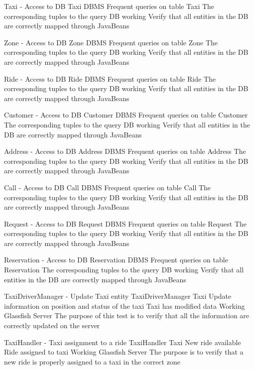 \testx
{Taxi - Access to DB}
{Taxi}
{DBMS}
{Frequent queries on table Taxi}
{The corresponding tuples to the query}
{DB working}
{Verify that all entities in the DB are correctly mapped through JavaBeans}

\testx
{Zone - Access to DB}
{Zone}
{DBMS}
{Frequent queries on table Zone}
{The corresponding tuples to the query}
{DB working}
{Verify that all entities in the DB are correctly mapped through JavaBeans}

\testx
{Ride - Access to DB}
{Ride}
{DBMS}
{Frequent queries on table Ride}
{The corresponding tuples to the query}
{DB working}
{Verify that all entities in the DB are correctly mapped through JavaBeans}

\testx
{Customer - Access to DB}
{Customer}
{DBMS}
{Frequent queries on table Customer}
{The corresponding tuples to the query}
{DB working}
{Verify that all entities in the DB are correctly mapped through JavaBeans}

\testx
{Address - Access to DB}
{Address}
{DBMS}
{Frequent queries on table Address}
{The corresponding tuples to the query}
{DB working}
{Verify that all entities in the DB are correctly mapped through JavaBeans}

\testx
{Call - Access to DB}
{Call}
{DBMS}
{Frequent queries on table Call}
{The corresponding tuples to the query}
{DB working}
{Verify that all entities in the DB are correctly mapped through JavaBeans}

\testx
{Request - Access to DB}
{Request}
{DBMS}
{Frequent queries on table Request}
{The corresponding tuples to the query}
{DB working}
{Verify that all entities in the DB are correctly mapped through JavaBeans}

\testx
{Reservation - Access to DB}
{Reservation}
{DBMS}
{Frequent queries on table Reservation}
{The corresponding tuples to the query}
{DB working}
{Verify that all entities in the DB are correctly mapped through JavaBeans}

\testx
{TaxiDriverManager - Update Taxi entity}
{TaxiDriverManager}
{Taxi}
{Update information on position and status of the taxi}
{Taxi has modified data}
{Working Glassfish Server}
{The purpose of this test is to verify that all the information are correctly updated on the server}

\testx
{TaxiHandler - Taxi assignment to a ride}
{TaxiHandler}
{Taxi}
{New ride available}
{Ride assigned to taxi}
{Working Glassfish Server}
{The purpose is to verify that a new ride is properly assigned to a taxi in the correct zone}

